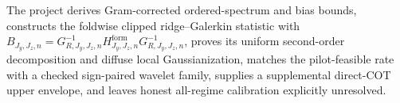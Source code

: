 The project derives Gram-corrected ordered-spectrum and bias bounds, constructs the foldwise clipped ridge--Galerkin statistic with \(B_{J_y,J_z,n}=G_{R,J_y,J_z,n}^{-1}H^{\mathrm{form}}_{J_y,J_z,n}G_{R,J_y,J_z,n}^{-1}\), proves its uniform second-order decomposition and diffuse local Gaussianization, matches the pilot-feasible rate with a checked sign-paired wavelet family, supplies a supplemental direct-COT upper envelope, and leaves honest all-regime calibration explicitly unresolved.